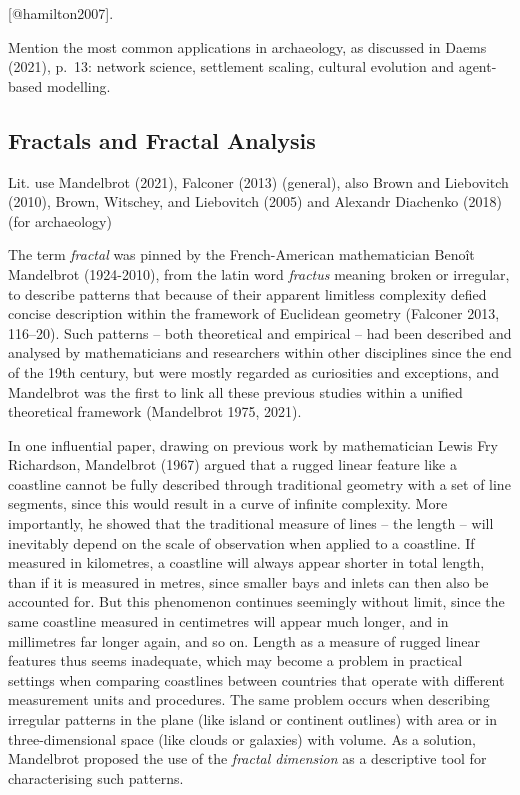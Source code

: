 \documentclass[
  12pt,
  a4paper, twoside]{book}
\begin{document}
{[}@hamilton2007{]}.

Mention the most common applications in archaeology, as discussed in Daems (2021), p.~13: network science, settlement scaling, cultural evolution and agent-based modelling.

\hypertarget{fractals}{%
\subsection{Fractals and Fractal Analysis}\label{fractals}}

Lit. use Mandelbrot (2021), Falconer (2013) (general), also Brown and Liebovitch (2010), Brown, Witschey, and Liebovitch (2005) and Alexandr Diachenko (2018) (for archaeology)

The term \emph{fractal} was pinned by the French-American mathematician Benoît Mandelbrot (1924-2010), from the latin word \emph{fractus} meaning broken or irregular, to describe patterns that because of their apparent limitless complexity defied concise description within the framework of Euclidean geometry (Falconer 2013, 116--20). Such patterns -- both theoretical and empirical -- had been described and analysed by mathematicians and researchers within other disciplines since the end of the 19th century, but were mostly regarded as curiosities and exceptions, and Mandelbrot was the first to link all these previous studies within a unified theoretical framework (Mandelbrot 1975, 2021).

In one influential paper, drawing on previous work by mathematician Lewis Fry Richardson, Mandelbrot (1967) argued that a rugged linear feature like a coastline cannot be fully described through traditional geometry with a set of line segments, since this would result in a curve of infinite complexity. More importantly, he showed that the traditional measure of lines -- the length -- will inevitably depend on the scale of observation when applied to a coastline. If measured in kilometres, a coastline will always appear shorter in total length, than if it is measured in metres, since smaller bays and inlets can then also be accounted for. But this phenomenon continues seemingly without limit, since the same coastline measured in centimetres will appear much longer, and in millimetres far longer again, and so on. Length as a measure of rugged linear features thus seems inadequate, which may become a problem in practical settings when comparing coastlines between countries that operate with different measurement units and procedures. The same problem occurs when describing irregular patterns in the plane (like island or continent outlines) with area or in three-dimensional space (like clouds or galaxies) with volume. As a solution, Mandelbrot proposed the use of the \emph{fractal dimension} as a descriptive tool for characterising such patterns.
\end{document}
